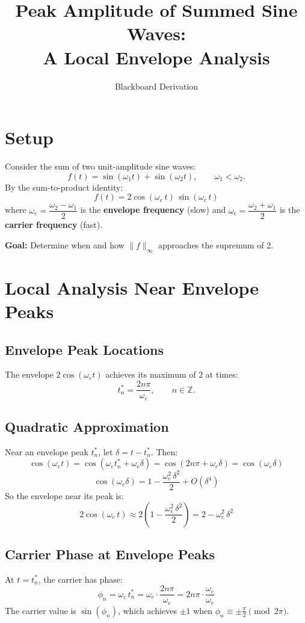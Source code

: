 \documentclass[12pt]{article}
\title{\textbf{Peak Amplitude of Summed Sine Waves:\\A Local Envelope Analysis}}
\author{Blackboard Derivation}
\date{}
\theoremstyle{definition}
\theoremstyle{remark}
\begin{document}
\maketitle

\section{Setup}

Consider the sum of two unit-amplitude sine waves:
\[
f(t) = \sin(\omega_1 t) + \sin(\omega_2 t), \qquad \omega_1 < \omega_2.
\]
By the sum-to-product identity:
\[
\boxed{f(t) = 2\cos(\omega_e\, t)\,\sin(\omega_c\, t)}
\]
where $\omega_e = \dfrac{\omega_2 - \omega_1}{2}$ is the \textbf{envelope frequency} (slow) and $\omega_c = \dfrac{\omega_2 + \omega_1}{2}$ is the \textbf{carrier frequency} (fast).

\begin{tcolorbox}[colback=blue!5, colframe=blue!50!black]
\textbf{Goal:} Determine when and how $\|f\|_\infty$ approaches the supremum of $2$.
\end{tcolorbox}

\section{Local Analysis Near Envelope Peaks}

\subsection{Envelope Peak Locations}
The envelope $2\cos(\omega_e t)$ achieves its maximum of $2$ at times:
\[
t_n^* = \frac{2n\pi}{\omega_e}, \qquad n \in \mathbb{Z}.
\]

\subsection{Quadratic Approximation}
Near an envelope peak $t_n^*$, let $\delta = t - t_n^*$. Then:
\[
\cos(\omega_e t) = \cos(\omega_e t_n^* + \omega_e \delta) = \cos(2n\pi + \omega_e\delta) = \cos(\omega_e\delta)
\]
\[
\cos(\omega_e \delta) = 1 - \frac{\omega_e^2\,\delta^2}{2} + O(\delta^4)
\]
So the envelope near its peak is:
\[
2\cos(\omega_e\,t) \approx 2\left(1 - \frac{\omega_e^2\,\delta^2}{2}\right) = 2 - \omega_e^2\,\delta^2
\]

\subsection{Carrier Phase at Envelope Peaks}
At $t = t_n^*$, the carrier has phase:
\[
\phi_n = \omega_c\,t_n^* = \omega_c \cdot \frac{2n\pi}{\omega_e} = 2n\pi\cdot\frac{\omega_c}{\omega_e}
\]
The carrier value is $\sin(\phi_n)$, which achieves $\pm 1$ when $\phi_n \equiv \pm\tfrac{\pi}{2} \pmod{2\pi}$.
\end{document}
